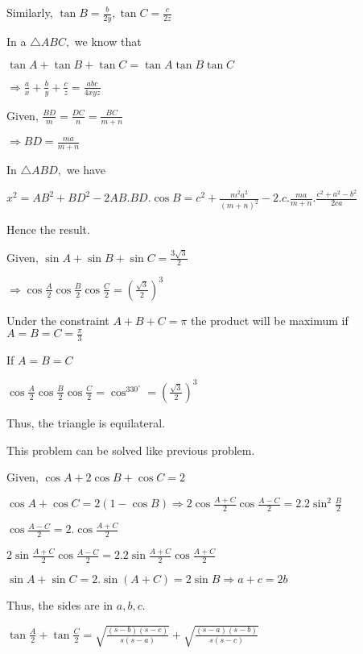   Similarly, $\tan B = \frac{b}{2y}, \tan C = \frac{c}{2z}$

  In a $\triangle ABC,$ we know that

  $\tan A + \tan B + \tan C = \tan A\tan B\tan C$

  $\Rightarrow \frac{a}{x} + \frac{b}{y} + \frac{c}{z} = \frac{abc}{4xyz}$

\item Given, $\frac{BD}{m} = \frac{DC}{n} = \frac{BC}{m + n}$

  $\Rightarrow BD = \frac{ma}{m + n}$

  In $\triangle ABD,$ we have

  $x^2 = AB^2 + BD^2 - 2AB.BD.\cos B = c^2 + \frac{m^2a^2}{(m + n)^2} - 2.c.\frac{ma}{m + n}.\frac{c^2 + a^2 - b^2}{2ca}$

  Hence the result.

\item Given, $\sin A + \sin B + \sin C = \frac{3\sqrt{3}}{2}$

  $\Rightarrow \cos\frac{A}{2}\cos\frac{B}{2}\cos\frac{C}{2} = \left(\frac{\sqrt{3}}{2}\right)^3$

  Under the constraint $A + B + C = \pi$ the product will be maximum if $A = B = C = \frac{\pi}{3}$

  If $A = B = C$

  $\cos\frac{A}{2}\cos\frac{B}{2}\cos\frac{C}{2} = \cos^330^\circ = \left(\frac{\sqrt{3}}{2}\right)^3$

  Thus, the triangle is equilateral.

\item This problem can be solved like previous problem.

\item Given, $\cos A + 2\cos B + \cos C = 2$

  $\cos A + \cos C = 2(1 - \cos B) \Rightarrow 2\cos\frac{A + C}{2}\cos\frac{A - C}{2} = 2.2\sin^2\frac{B}{2}$

  $\cos\frac{A - C}{2} = 2.\cos\frac{A + C}{2}$

  $2\sin\frac{A + C}{2}\cos\frac{A - C}{2} = 2.2\sin\frac{A + C}{2}\cos\frac{A + C}{2}$

  $\sin A + \sin C = 2.\sin(A + C) = 2\sin B \Rightarrow a + c = 2b$

  Thus, the sides are in $a,b,c.$

\item $\tan\frac{A}{2} + \tan\frac{C}{2} = \sqrt{\frac{(s - b)(s - c)}{s(s - a)}} + \sqrt{\frac{(s - a)(s - b)}{s(s - c)}}$

